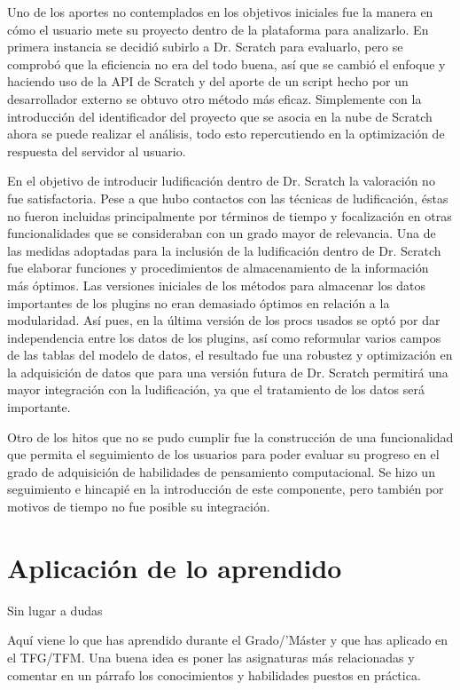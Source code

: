 \documentclass[a4paper, 12pt]{book}
\begin{document}
Uno de los aportes no contemplados en los objetivos iniciales fue la
manera en cómo el usuario mete su proyecto dentro de la plataforma
para analizarlo. En primera instancia se decidió subirlo a Dr. Scratch
para evaluarlo, pero se comprobó que la eficiencia no era del todo
buena, así que se cambió el enfoque y haciendo uso de la API de Scratch
y del aporte de un script hecho por un desarrollador externo se 
obtuvo otro método más eficaz. Simplemente con la introducción del 
identificador del proyecto que se asocia en la nube de Scratch ahora
se puede realizar el análisis, todo esto repercutiendo en la optimización 
de respuesta del servidor al usuario.


En el objetivo de introducir ludificación dentro de Dr. Scratch la 
valoración no fue satisfactoria. Pese a que hubo contactos con las 
técnicas de ludificación, éstas no fueron incluidas principalmente 
por términos de tiempo y focalización en otras funcionalidades que 
se consideraban con un grado mayor de relevancia. Una de las medidas
adoptadas para la inclusión de la ludificación dentro de Dr. Scratch
fue elaborar funciones y procedimientos de almacenamiento de la 
información más óptimos. Las versiones iniciales de los métodos para 
almacenar los datos importantes de los plugins no eran demasiado 
óptimos en relación a la modularidad. Así pues, en la última versión
de los procs usados se optó por dar independencia entre los datos de 
los plugins, así como reformular varios campos de las tablas del
modelo de datos, el resultado fue una robustez y optimización en la
adquisición de datos que para una versión futura de Dr. Scratch 
permitirá una mayor integración con la ludificación, ya que el 
tratamiento de los datos será importante.

Otro de los hitos que no se pudo cumplir fue la construcción de una
funcionalidad que permita el seguimiento de los usuarios para poder
evaluar su progreso en el grado de adquisición de habilidades de 
pensamiento computacional. Se hizo un seguimiento e hincapié en la 
introducción de este componente, pero también por motivos de tiempo
no fue posible su integración. 


\section{Aplicación de lo aprendido}
\label{sec:aplicacion}

Sin lugar a dudas

Aquí viene lo que has aprendido durante el Grado/'Máster y que has aplicado
en el TFG/TFM. Una buena idea es poner las asignaturas más relacionadas y
comentar en un párrafo los conocimientos y habilidades puestos en práctica.
\end{document}
